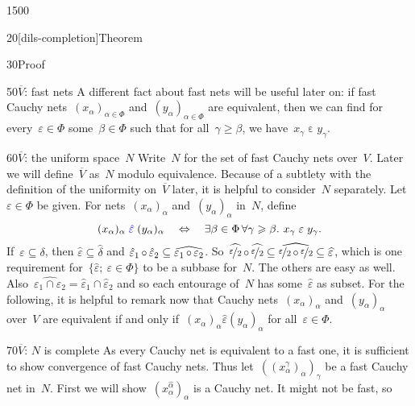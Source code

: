 \begin{parsec}{1500}
\begin{point}{20}[dils-completion]{Theorem}
\begin{point}{30}{Proof}
\begin{point}{50}{$\overline{V}$: fast nets}
A different fact about fast nets will be useful later on:
if fast Cauchy nets~$(x_\alpha)_{\alpha \in \Phi}$
    and~$(y_\alpha)_{\alpha \in \Phi}$ are equivalent,
    then we can find for every~$\varepsilon \in \Phi$
    some~$\beta \in \Phi$
    such that for all~$\gamma \geq \beta$,
    we have~$x_\gamma \mathrel{\varepsilon} y_\gamma$.
\end{point}
\begin{point}{60}{$\overline{V}$: the uniform space~$N$}%
Write~$N$ for the set of fast Cauchy nets over~$V$.
Later we will define~$\overline{V}$ as~$N$ modulo equivalence.
Because of a subtlety with the definition of the uniformity
    on~$\overline{V}$ later,
    it is helpful to consider~$N$ separately.
Let~$\varepsilon \in \Phi$ be given.
For nets~$(x_\alpha)_{\alpha}$
    and~$(y_\alpha)_{\alpha}$ in~$N$,
    define
    \begin{equation*}
        (x_\alpha)_\alpha \mathrel{\Define{\hat\varepsilon}\index{*epsi@$\hat\varepsilon$}}
            (y_\alpha)_\alpha
            \quad\Leftrightarrow\quad
        \exists \beta \in \Phi \, \forall \gamma \geq \beta. \ 
        x_\gamma \mathrel{\varepsilon} y_\gamma.
    \end{equation*}
If~$\varepsilon \subseteq \delta$,
then $\hat\varepsilon \subseteq \hat\delta$
and
$\hat\varepsilon_1 \mathop{\circ} \hat\varepsilon_2 
\subseteq\widehat{\varepsilon_1 \mathop{\circ} \varepsilon_2}$.
So~$
\widehat{\nicefrac{\varepsilon}{2}} \mathop{\circ}
\widehat{\nicefrac{\varepsilon}{2}} \subseteq
\widehat{\nicefrac{\varepsilon}{2} \mathop{\circ}
\nicefrac{\varepsilon}{2}} \subseteq \widehat{\varepsilon}$,
which is one requirement for~$\{ \hat\varepsilon; \ \varepsilon \in \Phi\}$
to be a subbase for~$N$.
The others are easy as well. 
Also~$\widehat{\varepsilon_1 \cap \varepsilon_2} = \hat{\varepsilon}_1
    \cap \hat{\varepsilon}_2$
    and so each entourage of~$N$ has some~$\hat\varepsilon$ as subset.
For the following,
    it is helpful to remark now
    that Cauchy nets~$(x_\alpha)_\alpha$ and~$(y_\alpha)_\alpha$ over~$V$
    are equivalent if and only if~$(x_\alpha)_\alpha \mathrel{\hat\varepsilon}
    (y_\alpha)_\alpha$ for all~$\varepsilon \in \Phi$.
\end{point}
\begin{point}{70}{$\overline{V}$: $N$ is complete}%
As every Cauchy net is equivalent to a fast one,
it is sufficient to show convergence of fast Cauchy nets.
Thus let~$((x^\gamma_\alpha)_\alpha)_\gamma$
    be a fast Cauchy net in~$N$.
First we will show~$(x^{\hat\alpha}_\alpha)_\alpha$
    is a Cauchy net.
It might not be fast, so

\end{point}
\end{point}
\end{point}
\end{parsec}
